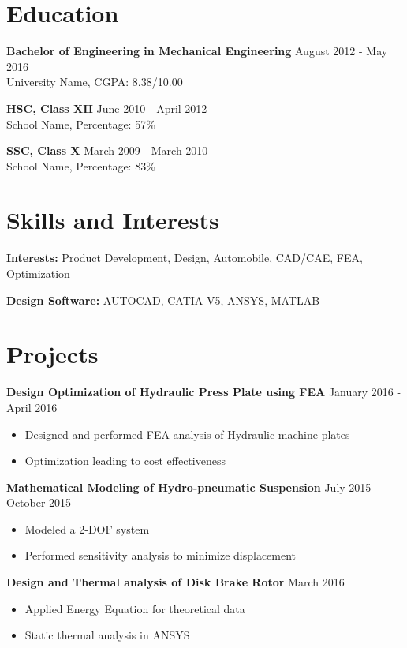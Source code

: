 \documentclass[a4paper,11pt]{article}
\begin{document}
\section{Education}
\textbf{Bachelor of Engineering in Mechanical Engineering} \hfill August 2012 - May 2016 \\
University Name, CGPA: 8.38/10.00

\textbf{HSC, Class XII} \hfill June 2010 - April 2012 \\
School Name, Percentage: 57\%

\textbf{SSC, Class X} \hfill March 2009 - March 2010 \\
School Name, Percentage: 83\%

\section{Skills and Interests}
\textbf{Interests:} Product Development, Design, Automobile, CAD/CAE, FEA, Optimization

\textbf{Design Software:} AUTOCAD, CATIA V5, ANSYS, MATLAB

\section{Projects}

\textbf{Design Optimization of Hydraulic Press Plate using FEA} \hfill January 2016 - April 2016
\begin{itemize}
  \item Designed and performed FEA analysis of Hydraulic machine plates
  \item Optimization leading to cost effectiveness
\end{itemize}

\textbf{Mathematical Modeling of Hydro-pneumatic Suspension} \hfill July 2015 - October 2015
\begin{itemize}
  \item Modeled a 2-DOF system
  \item Performed sensitivity analysis to minimize displacement
\end{itemize}

\textbf{Design and Thermal analysis of Disk Brake Rotor} \hfill March 2016
\begin{itemize}
  \item Applied Energy Equation for theoretical data
  \item Static thermal analysis in ANSYS
\end{itemize}
\end{document}
